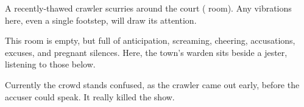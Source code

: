 \begin{multicols}{2}

A recently-thawed \gls{crawler} scurries around the \gls{court} ( room).
Any vibrations here, even a single footstep, will draw its attention.


\begin{exampletext}
  This room is empty, but full of anticipation, screaming, cheering, accusations, excuses, and pregnant silences.
  Here, the town's \gls{warden} sits beside a jester, listening to those below.
\end{exampletext}

Currently the crowd stands confused, as the \gls{crawler} came out early, before the accuser could speak.
It really killed the show.

\chitincrawler

\end{multicols}
